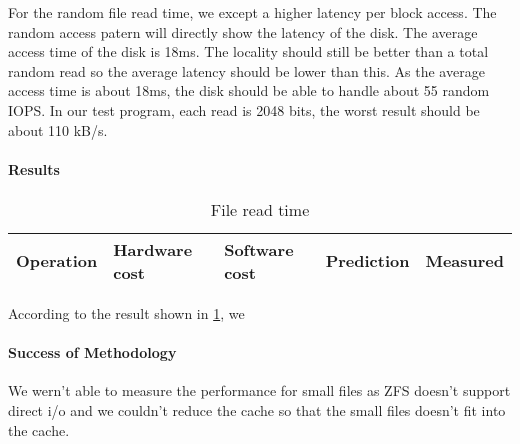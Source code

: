 For the random file read time, we except a higher latency per block access.
The random access patern will directly show the latency of the disk.
The average access time of the disk is 18ms.
The locality should still be better than a total random read so the average
latency should be lower than this.
As the average access time is about 18ms, the disk should be able to handle
about 55 random IOPS.
In our test program, each read is 2048 bits, the worst result should be about 110 kB/s.

\paragraph{Results}

\begin{table}[h]
\begin{center}
\begin{tabular}{| l | l | l | l | l |}
\hline
Operation & Hardware cost & Software cost & Prediction & Measured \\
\hline
\end{tabular}
\end{center}
\caption{File read time\label{tab:file-read-time}}
\end{table}

According to the result shown in \ref{tab:file-read-time}, we


\paragraph{Success of Methodology}
We wern't able to measure the performance for small files as ZFS doesn't support
direct i/o and we couldn't reduce the cache so that the small files doesn't fit
into the cache.





